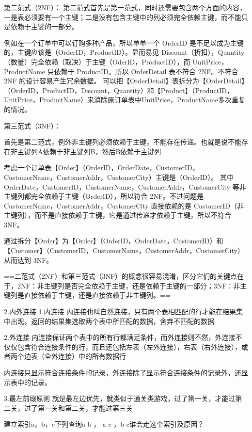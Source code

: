 \documentclass[UTF8]{ctexart}
\begin{document}
第二范式（2NF）：
第二范式首先是第一范式，同时还需要包含两个方面的内容，一是表必须要有一个主键；二是没有包含主键中的列必须完全依赖主键，而不能只是依赖于主键的一部分。

例如在一个订单中可以订购多种产品，所以单单一个 OrderID 是不足以成为主键的，主键应该是（OrderID，ProductID）。显而易见 Discount（折扣），Quantity（数量）完全依赖（取决）于主键（OderID，ProductID），而 UnitPrice，ProductName 只依赖于 ProductID。所以 OrderDetail 表不符合 2NF。不符合 2NF 的设计容易产生冗余数据。 可以把【OrderDetail】表拆分为【OrderDetail】（OrderID，ProductID，Discount，Quantity）和【Product】（ProductID，UnitPrice，ProductName）来消除原订单表中UnitPrice，ProductName多次重复的情况。

第三范式（3NF）：

首先是第二范式，例外非主键列必须依赖于主键，不能存在传递。也就是说不能存在非主键列A依赖于非主键列B，然后B依赖于主键列

考虑一个订单表【Order】（OrderID，OrderDate，CustomerID，CustomerName，CustomerAddr，CustomerCity）主键是（OrderID）。
其中 OrderDate，CustomerID，CustomerName，CustomerAddr，CustomerCity 等非主键列都完全依赖于主键（OrderID），所以符合 2NF。不过问题是 CustomerName，CustomerAddr，CustomerCity 直接依赖的是 CustomerID（非主键列），而不是直接依赖于主键，它是通过传递才依赖于主键，所以不符合 3NF。

通过拆分【Order】为【Order】（OrderID，OrderDate，CustomerID）和【Customer】（CustomerID，CustomerName，CustomerAddr，CustomerCity）从而达到 3NF。

==二范式（2NF）和第三范式（3NF）的概念很容易混淆，区分它们的关键点在于，2NF：非主键列是否完全依赖于主键，还是依赖于主键的一部分；3NF：非主键列是直接依赖于主键，还是直接依赖于非主键列。==

2.内外连接
1.内连接
内连接也叫自然连接，只有两个表相匹配的行才能在结果集中出现。返回的结果集选取两个表中所匹配的数据，舍弃不匹配的数据

2.外连接
内连接保证两个表中的所有行都满足条件，而外连接则不然，外连接不仅仅包含符合连接条件的行，而且还包括左表（左外连接），右表（右外连接），或者两个边表（全外连接）中的所有数据行

内连接只显示符合连接条件的记录，外连接除了显示符合连接条件的记录外，还显示表中的记录。

3.最左前缀原则
就是最左边优先，就类似于通关类游戏，过了第一关，才能过第二关，过了第一关和第二关，才能过第三关

建立索引a，b，c下列查询a b ， a c ，b c谁会走这个索引及原因？
\end{document}
